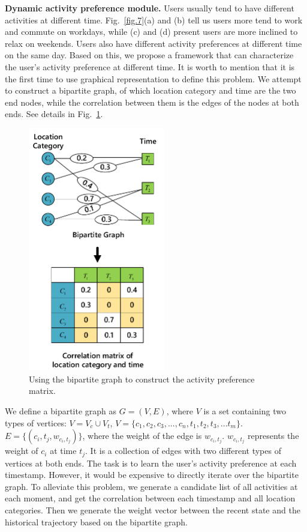 \documentclass[10pt,journal,compsoc]{IEEEtran}
\begin{document}
\textbf{Dynamic activity preference module.} Users usually tend to have different activities at different time. Fig.~\ref{fig.7}(a) and (b) tell us users more tend to work and commute on workdays, while (c) and (d) present users are more inclined to relax on weekends. Users also have different activity preferences at different time on the same day. Based on this, we propose a framework that can characterize the user's activity preference at different time. It is worth to mention that it is the first time to use graphical representation to define this problem. We attempt to construct a bipartite graph, of which location category and time are the two end nodes, while the correlation between them is the edges of the nodes at both ends. See details in Fig.~\ref{fig.8}.

\begin{figure}[htpb]
    \centering
    \includegraphics[width=6cm]{figure/fig8.pdf}
    \caption{Using the bipartite graph to construct the activity preference matrix.}
    \label{fig.8}
\end{figure}

We define a bipartite graph as $G=(V,E)$, where $V$ is a set containing two types of vertices: $V=V_c\cup{V_t}$, $V = \{c_1,c_2,c_3,...,c_n,t_1,t_2,t_3,...t_m\}$. $E=\{(c_i,t_j,w_{c_i,t_j})\}$, where the weight of the edge is $w_{c_i,t_j}$. $w_{c_i,t_j}$ represents the weight of $c_i$ at time $t_j$. It is a collection of edges with two different types of vertices at both ends. The task is to learn the user's activity preference at each timestamp. However, it would be expensive to directly iterate over the bipartite graph. To alleviate this problem, we generate a candidate list of all activities at each moment, and get the correlation between each timestamp and all location categories. Then we generate the weight vector between the recent state and the historical trajectory based on the bipartite graph.
\end{document}
